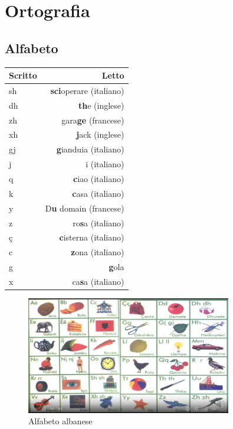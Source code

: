 
\chapter{Ortografia}

\section{Alfabeto}

\begin{table}[H]
    \centering
    \begin{tabular}{lr}
        \toprule
        Scritto     &   Letto \\
        \midrule
        sh          &   \textbf{sci}operare (italiano)\\
        dh          &   \textbf{th}e (inglese) \\
        zh          &   gara\textbf{ge} (francese)\\
        xh          &   \textbf{j}ack (inglese) \\
        gj          &   \textbf{g}ianduia (italiano)\\
        j           &   i (italiano)\\
        q           &   \textbf{c}iao (italiano)\\
        k           &   \textbf{c}asa (italiano)\\ 
        y           &   D\textbf{u} domain (francese)\\
        z           &   ro\textbf{s}a (italiano) \\
        ç           &   \textbf{c}isterna (italiano) \\
        c           &   \textbf{z}ona (italiano) \\
        g           &   \textbf{g}ola \\
        x           &   ca\textbf{s}a (italiano) \\
        \bottomrule
    \end{tabular}
\end{table}


\begin{figure}[H]
    \centering
    \includegraphics[width=0.8\textwidth]{src/images/alfabetoAlbanese.PNG}
    \caption{Alfabeto albanese}
\end{figure}

